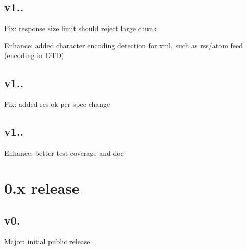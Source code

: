 \subsection*{v1..}


\begin{DoxyItemize}
\item Fix\+: response size limit should reject large chunk
\item Enhance\+: added character encoding detection for xml, such as rss/atom feed (encoding in D\+TD)
\end{DoxyItemize}

\subsection*{v1..}


\begin{DoxyItemize}
\item Fix\+: added res.\+ok per spec change
\end{DoxyItemize}

\subsection*{v1..}


\begin{DoxyItemize}
\item Enhance\+: better test coverage and doc
\end{DoxyItemize}

\section*{0.\+x release}

\subsection*{v0.}


\begin{DoxyItemize}
\item Major\+: initial public release 
\end{DoxyItemize}